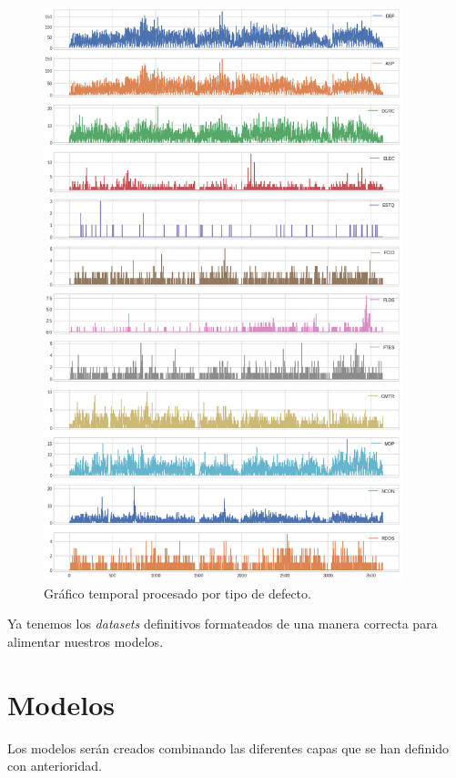 \documentclass[a4paper,12pt]{article}
\begin{document}
\begin{figure}[H]
	\begin{center}
	\includegraphics[width=0.93\textwidth]{multi_post_flia.png}
  	\caption{Gráfico temporal procesado por tipo de defecto.}
  	\label{fig:graf_post_mult_tipo}
  	\end{center}
\end{figure}

Ya tenemos los \textit{datasets} definitivos formateados de una manera correcta para alimentar nuestros modelos.

\section{Modelos}

Los modelos serán creados combinando las diferentes capas que se han definido con anterioridad.
\end{document}

